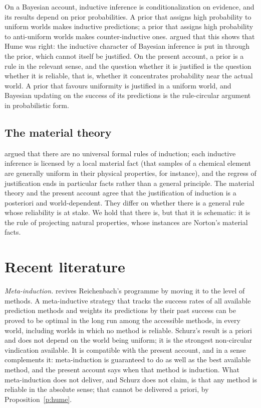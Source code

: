 \documentclass{situationist-preprint}
\begin{document}
On a Bayesian account, inductive inference is conditionalization on evidence, and its results depend on prior probabilities. A prior that assigns high probability to uniform worlds makes inductive predictions; a prior that assigns high probability to anti-uniform worlds makes counter-inductive ones. \citet{Howson2000} argued that this shows that Hume was right: the inductive character of Bayesian inference is put in through the prior, which cannot itself be justified. On the present account, a prior is a rule in the relevant sense, and the question whether it is justified is the question whether it is reliable, that is, whether it concentrates probability near the actual world. A prior that favours uniformity is justified in a uniform world, and Bayesian updating on the success of its predictions is the rule-circular argument in probabilistic form.

\subsection{The material theory}

\citet{Norton2003} argued that there are no universal formal rules of induction; each inductive inference is licensed by a local material fact (that samples of a chemical element are generally uniform in their physical properties, for instance), and the regress of justification ends in particular facts rather than a general principle. The material theory and the present account agree that the justification of induction is a posteriori and world-dependent. They differ on whether there is a general rule whose reliability is at stake. We hold that there is, but that it is schematic: it is the rule of projecting natural properties, whose instances are Norton's material facts.

\section{Recent literature}\label{s:recent}

\emph{Meta-induction.} \citet{Schurz2019} revives Reichenbach's programme by moving it to the level of methods. A meta-inductive strategy that tracks the success rates of all available prediction methods and weights its predictions by their past success can be proved to be optimal in the long run among the accessible methods, in every world, including worlds in which no method is reliable. Schurz's result is a priori and does not depend on the world being uniform; it is the strongest non-circular vindication available. It is compatible with the present account, and in a sense complements it: meta-induction is guaranteed to do as well as the best available method, and the present account says when that method is induction. What meta-induction does not deliver, and Schurz does not claim, is that any method is reliable in the absolute sense; that cannot be delivered a priori, by Proposition~\ref{p:hume}.
\end{document}
